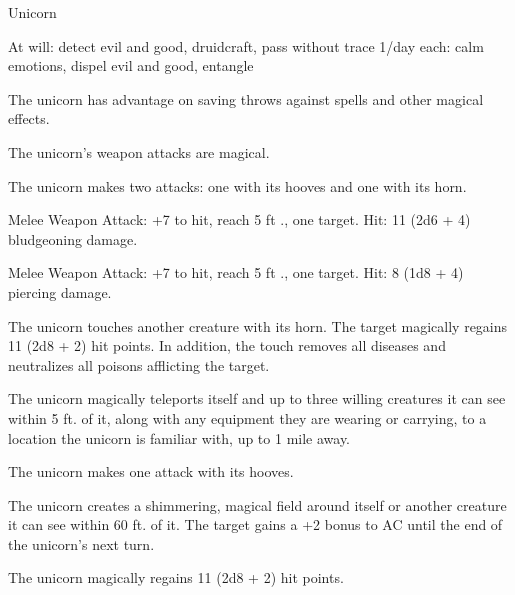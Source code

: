 \begin{monsterbox}{Unicorn}
\begin{monsteraction}
At will: detect evil and good, druidcraft, pass without trace
1/day each: calm emotions, dispel evil and good, entangle
\end{monsteraction}
\begin{monsteraction}
The unicorn has advantage on saving throws against spells and other magical effects.
\end{monsteraction}
\begin{monsteraction}
The unicorn's weapon attacks are magical.
\end{monsteraction}
\begin{monsteraction}[Multiattack]
The unicorn makes two attacks: one with its hooves and one with its horn.
\end{monsteraction}
\begin{monsteraction}[Hooves]
Melee Weapon Attack: +7 to hit, reach 5 ft ., one target. Hit: 11 (2d6 + 4) bludgeoning damage.
\end{monsteraction}
\begin{monsteraction}[Horn]
Melee Weapon Attack: +7 to hit, reach 5 ft ., one target. Hit: 8 (1d8 + 4) piercing damage.
\end{monsteraction}
\begin{monsteraction}
The unicorn touches another creature with its horn. The target magically regains 11 (2d8 + 2) hit points. In addition, the touch removes all diseases and neutralizes all poisons afflicting the target.
\end{monsteraction}
\begin{monsteraction}
The unicorn magically teleports itself and up to three willing creatures it can see within 5 ft. of it, along with any equipment they are wearing or carrying, to a location the unicorn is familiar with, up to 1 mile away.
\end{monsteraction}
\begin{monsteraction}[Hooves]
The unicorn makes one attack with its hooves.
\end{monsteraction}
\begin{monsteraction}
The unicorn creates a shimmering, magical field around itself or another creature it can see within 60 ft. of it. The target gains a +2 bonus to AC until the end of the unicorn's next turn.
\end{monsteraction}
\begin{monsteraction}
The unicorn magically regains 11 (2d8 + 2) hit points.
\end{monsteraction}
\end{monsterbox}